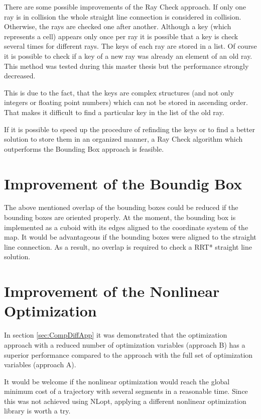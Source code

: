 There are some possible improvements of the Ray Check approach. If only one ray is in collision the whole straight line connection is considered in collision. Otherwise,  the rays are checked one after another. Although a key (which represents a cell) appears only once per ray it is possible that a key is check several times for different rays. The keys of each ray are stored in a list. Of course it is possible to check if a key of a new ray was already an element of an old ray. This method was tested during this master thesis but the performance strongly decreased. 

This is due to the fact, that the keys are complex structures (and not only integers or floating point numbers) which can not be stored in ascending order. That makes it difficult to find a particular key in the list of the old ray. \newline

If it is possible to speed up the procedure of refinding the keys or to find a better solution to store them in an organized manner, a Ray Check algorithm which outperforms the Bounding Box approach is feasible.

\section{Improvement of the Boundig Box}\label{sec:furureBoundingBox}

The above mentioned overlap of the bounding boxes could be reduced if the bounding boxes are oriented properly. At the moment, the bounding box is implemented as a cuboid with its edges aligned to the coordinate system of the map. It would be advantageous if the bounding boxes were aligned to the straight line connection. As a result, no overlap is required to check a RRT* straight line solution. 

\section{Improvement of the Nonlinear Optimization}\label{sec:furureNonOpt}

In section \ref{sec:CompDiffApp} it was demonstrated that the optimization approach with a reduced number of optimization variables (approach B) has a superior performance compared to the approach with the full set of optimization variables (approach A).  \newline

It would be welcome if the nonlinear optimization would reach the global minimum cost of a trajectory with several segments in a reasonable time. Since this was not achieved using NLopt, applying a different nonlinear optimization library is worth a try.

